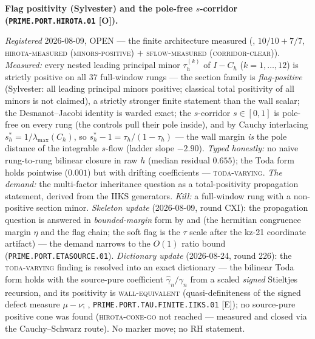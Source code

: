 \documentclass[11pt,a4paper]{article}
\begin{document}
\par\smallskip\noindent\textbf{Flag positivity (Sylvester) and the
pole-free $s$-corridor
(\texttt{PRIME.PORT.\allowbreak HIROTA.01} [O]).}
{\sloppy
\emph{Registered} 2026-08-09, OPEN --- the finite architecture
measured (, $10/10 +
7/7$, \textsc{hirota-measured (minors-positive)} $+$
\textsc{sflow-measured (corridor-clear)}).  \emph{Measured:}
every nested leading principal minor $\tau^{(k)}_h$ of $I -
C_h$ ($k = 1, \dots, 12$) is strictly positive on all $37$
full-window rungs --- the section family is \emph{flag-positive}
(Sylvester: all leading principal minors positive; classical
total positivity of all minors is not claimed), a strictly
stronger finite statement than the wall
scalar; the Desnanot--Jacobi identity is warded exact; the
$s$-corridor $s \in [0, 1]$ is pole-free on every rung (the
controls pull their pole inside), and by Cauchy interlacing
$s^{*}_h = 1/\lambda_{\max}(C_h)$, so $s^{*}_h - 1 =
\tau_h/(1 - \tau_h)$ --- the wall margin \emph{is} the pole
distance of the integrable $s$-flow (ladder slope $-2.90$).
\emph{Typed honestly:} no naive rung-to-rung bilinear closure
in raw $h$ (median residual $0.655$); the Toda form holds
pointwise ($0.001$) but with drifting coefficients ---
\textsc{toda-varying}.  \emph{The demand:} the multi-factor
inheritance question as a total-positivity propagation
statement, derived from the IIKS generators.  \emph{Kill:} a
full-window rung with a non-positive section minor.
\emph{Skeleton update} (2026-08-09, round CXI): the
propagation question is answered in \emph{bounded-margin} form
by  and
 (the hermitian congruence
margin $\eta$ and the flag chain; the soft flag is the $\tau$
scale after the kz-21 coordinate artifact) --- the demand
narrows to the $O(1)$ ratio bound
(\texttt{PRIME.PORT.ETASOURCE.01}).  \emph{Dictionary update}
(2026-08-24, round 226): the \textsc{toda-varying} finding is
resolved into an exact dictionary --- the bilinear Toda form
holds with the source-pure coefficient $\hat\gamma_n/\gamma_n$
from a scaled \emph{signed} Stieltjes recursion, and its
positivity is \textsc{wall-equivalent} (quasi-definiteness of
the signed defect measure $\mu - \nu$;
,
\texttt{PRIME.PORT.TAU.FINITE.IIKS.01} [E]); no source-pure
positive cone was found (\textsc{hirota-cone-go} not reached
--- measured and closed via the Cauchy--Schwarz route).  No marker
move; no RH statement.\par}
\end{document}
